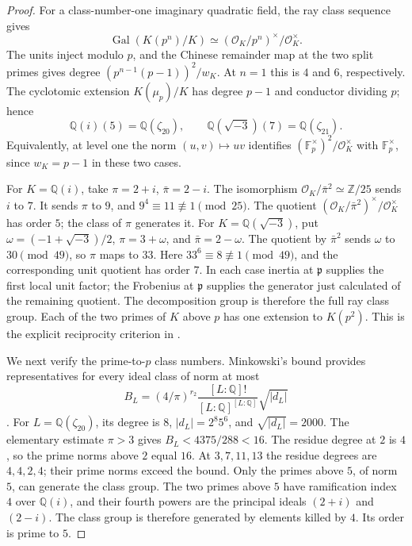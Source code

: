 \begin{proof}
For a class-number-one imaginary quadratic field, the ray class
sequence gives
\[
 \operatorname{Gal}(K(p^n)/K)
  \simeq(\mathcal O_K/p^n)^\times/\mathcal O_K^\times .
\]
The units inject modulo \(p\), and the Chinese remainder map at
the two split primes gives degree
\((p^{n-1}(p-1))^2/w_K\).
At \(n=1\) this is \(4\) and \(6\), respectively.
The cyclotomic extension \(K(\mu_p)/K\) has degree \(p-1\) and
conductor dividing \(p\); hence
\[
 \mathbb Q(i)(5)=\mathbb Q(\zeta_{20}),\qquad
 \mathbb Q(\sqrt{-3})(7)=\mathbb Q(\zeta_{21}) .
\]
Equivalently, at level one the norm
\((u,v)\mapsto uv\) identifies
\((\mathbb F_p^\times)^2/\mathcal O_K^\times\)
with \(\mathbb F_p^\times\), since \(w_K=p-1\) in these two cases.

For \(K=\mathbb Q(i)\), take \(\pi=2+i\), \(\bar\pi=2-i\).
The isomorphism \(\mathcal O_K/\bar\pi^2\simeq\mathbb Z/25\)
sends \(i\) to \(7\). It sends \(\pi\) to \(9\), and
\(9^4\equiv11\not\equiv1\pmod {25}\).
The quotient
\((\mathcal O_K/\bar\pi^2)^\times/\mathcal O_K^\times\)
has order \(5\); the class of \(\pi\) generates it.
For \(K=\mathbb Q(\sqrt{-3})\), put
\(\omega=(-1+\sqrt{-3})/2\), \(\pi=3+\omega\), and
\(\bar\pi=2-\omega\). The quotient by \(\bar\pi^2\)
sends \(\omega\) to \(30\pmod {49}\), so \(\pi\) maps to \(33\).
Here \(33^6\equiv8\not\equiv1\pmod {49}\), and the corresponding
unit quotient has order \(7\).
In each case inertia at \(\mathfrak p\) supplies the first local
unit factor; the Frobenius at \(\mathfrak p\) supplies the generator
just calculated of the remaining quotient. The decomposition group
is therefore the full ray class group. Each of the two primes of
\(K\) above \(p\) has one extension to \(K(p^2)\).
This is the explicit reciprocity criterion in
\cite[Remark 2.14.1, p.~11]{Ishii}.

We next verify the prime-to-\(p\) class numbers. Minkowski's bound
provides representatives for every ideal class of norm at most
\[
 B_L=(4/\pi)^{r_2}\frac{[L:\mathbb Q]!}
 {[L:\mathbb Q]^{[L:\mathbb Q]}}\sqrt{|d_L|}
\]
\cite[Theorem 4.3, p.~70]{MilneANT}.
For \(L=\mathbb Q(\zeta_{20})\), its degree is \(8\),
\(|d_L|=2^8 5^6\), and \(\sqrt{|d_L|}=2000\).
The elementary estimate \(\pi>3\) gives
\(B_L<4375/288<16\).
The residue degree at \(2\) is \(4\), so the prime norms above
\(2\) equal \(16\). At \(3,7,11,13\) the residue degrees are
\(4,4,2,4\); their prime norms exceed the bound.
Only the primes above \(5\), of norm \(5\), can generate the
class group. The two primes above \(5\) have ramification index
\(4\) over \(\mathbb Q(i)\), and their fourth powers are the
principal ideals \((2+i)\) and \((2-i)\). The class group is
therefore generated by elements killed by \(4\).
Its order is prime to \(5\).


\end{proof}
